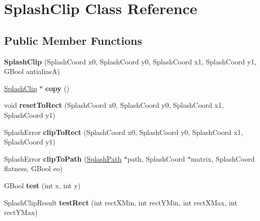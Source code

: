 \hypertarget{class_splash_clip}{}\section{Splash\+Clip Class Reference}
\label{class_splash_clip}
\subsection*{Public Member Functions}
\begin{DoxyCompactItemize}
\item 
\mbox{\label{class_splash_clip_ac88987297fc3f0cd916d38826ed7ce6d}} 
{\bfseries Splash\+Clip} (Splash\+Coord x0, Splash\+Coord y0, Splash\+Coord x1, Splash\+Coord y1, G\+Bool antialiasA)
\item 
\mbox{\label{class_splash_clip_a6e0ff92597c02e40ee9d827bc34f9c99}} 
\hyperlink{class_splash_clip}{Splash\+Clip} $\ast$ {\bfseries copy} ()
\item 
\mbox{\label{class_splash_clip_a1e419c285adf52e09fb8b59d1161bb9a}} 
void {\bfseries reset\+To\+Rect} (Splash\+Coord x0, Splash\+Coord y0, Splash\+Coord x1, Splash\+Coord y1)
\item 
\mbox{\label{class_splash_clip_a405135692a0fc3768bb86289d1926c04}} 
Splash\+Error {\bfseries clip\+To\+Rect} (Splash\+Coord x0, Splash\+Coord y0, Splash\+Coord x1, Splash\+Coord y1)
\item 
\mbox{\label{class_splash_clip_aa359cbbf73aebea894f191b523b7be4a}} 
Splash\+Error {\bfseries clip\+To\+Path} (\hyperlink{class_splash_path}{Splash\+Path} $\ast$path, Splash\+Coord $\ast$matrix, Splash\+Coord flatness, G\+Bool eo)
\item 
\mbox{\label{class_splash_clip_a0b2f70ed73cea0629870f8d9212693e6}} 
G\+Bool {\bfseries test} (int x, int y)
\item 
\mbox{\label{class_splash_clip_a4f3f18814c3fc3cdf435fa43bc3e0714}} 
Splash\+Clip\+Result {\bfseries test\+Rect} (int rect\+X\+Min, int rect\+Y\+Min, int rect\+X\+Max, int rect\+Y\+Max)
\item 
\mbox{\label{class_splash_clip_ad17453c0132e3422298ed2760a11d0c3}} 

\end{DoxyCompactItemize}
